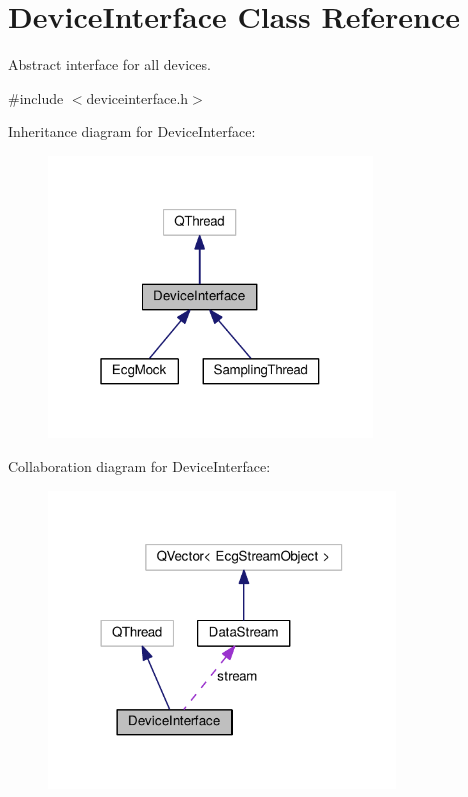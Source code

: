 \hypertarget{classDeviceInterface}{}\section{Device\+Interface Class Reference}
\label{classDeviceInterface}


Abstract interface for all devices.  




{\ttfamily \#include $<$deviceinterface.\+h$>$}



Inheritance diagram for Device\+Interface\+:
\nopagebreak
\begin{figure}[H]
\begin{center}
\leavevmode
\includegraphics[width=244pt]{classDeviceInterface__inherit__graph}
\end{center}
\end{figure}


Collaboration diagram for Device\+Interface\+:
\nopagebreak
\begin{figure}[H]
\begin{center}
\leavevmode
\includegraphics[width=261pt]{classDeviceInterface__coll__graph}
\end{center}
\end{figure}
